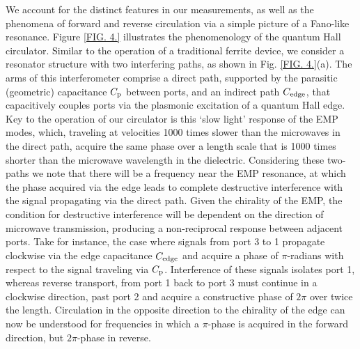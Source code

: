 We account for the distinct features in our measurements, as well as the phenomena of forward and reverse circulation via a simple picture of a Fano-like resonance. Figure \ref{FIG. 4.} illustrates the phenomenology of the quantum Hall circulator. Similar to the operation of a traditional ferrite device, we consider a resonator structure with two interfering paths, as shown in Fig. \ref{FIG. 4.}(a). The arms of this interferometer comprise a direct path, supported by the parasitic (geometric) capacitance $C_{\rm p}$ between ports, and an indirect path $C_{\rm edge}$, that capacitively couples ports via the plasmonic excitation of a quantum Hall edge. Key to the operation of our circulator is this `slow light' response of the EMP modes, which, traveling at velocities 1000 times slower than the microwaves in the direct path, acquire the same phase over a length scale that is 1000 times shorter than the microwave wavelength in the dielectric. Considering these two-paths we note that there will be a frequency near the EMP resonance, at which the phase acquired via the edge leads to complete destructive interference with the signal propagating via the direct path. Given the chirality of the EMP, the condition for destructive interference will be dependent on the direction of microwave transmission, producing a non-reciprocal response between adjacent ports. Take for instance, the case where signals from port 3 to 1 propagate clockwise via the edge capacitance $C_{\rm edge}$ and acquire a phase of $\pi$-radians with respect to the signal traveling via $C_{\rm p}$. Interference of these signals isolates port 1, whereas reverse transport, from port 1 back to port 3 must continue in a clockwise direction, past port 2 and acquire a constructive phase of $2 \pi$ over twice the length. Circulation in the opposite direction to the chirality of the edge can now be understood for frequencies in which a $\pi$-phase is acquired in the forward direction, but $2 \pi$-phase in reverse.

